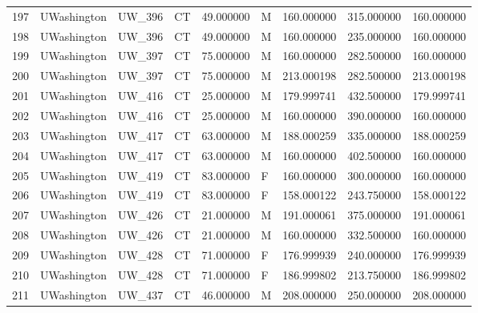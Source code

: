 \begin{tabular}{llllrlrrr}
197    &     UWashington &       UW\_396 &                 CT &  49.000000 &        M &       160.000000 &    315.000000 &  160.000000 \\
198    &     UWashington &       UW\_396 &                 CT &  49.000000 &        M &       160.000000 &    235.000000 &  160.000000 \\
199    &     UWashington &       UW\_397 &                 CT &  75.000000 &        M &       160.000000 &    282.500000 &  160.000000 \\
200    &     UWashington &       UW\_397 &                 CT &  75.000000 &        M &       213.000198 &    282.500000 &  213.000198 \\
201    &     UWashington &       UW\_416 &                 CT &  25.000000 &        M &       179.999741 &    432.500000 &  179.999741 \\
202    &     UWashington &       UW\_416 &                 CT &  25.000000 &        M &       160.000000 &    390.000000 &  160.000000 \\
203    &     UWashington &       UW\_417 &                 CT &  63.000000 &        M &       188.000259 &    335.000000 &  188.000259 \\
204    &     UWashington &       UW\_417 &                 CT &  63.000000 &        M &       160.000000 &    402.500000 &  160.000000 \\
205    &     UWashington &       UW\_419 &                 CT &  83.000000 &        F &       160.000000 &    300.000000 &  160.000000 \\
206    &     UWashington &       UW\_419 &                 CT &  83.000000 &        F &       158.000122 &    243.750000 &  158.000122 \\
207    &     UWashington &       UW\_426 &                 CT &  21.000000 &        M &       191.000061 &    375.000000 &  191.000061 \\
208    &     UWashington &       UW\_426 &                 CT &  21.000000 &        M &       160.000000 &    332.500000 &  160.000000 \\
209    &     UWashington &       UW\_428 &                 CT &  71.000000 &        F &       176.999939 &    240.000000 &  176.999939 \\
210    &     UWashington &       UW\_428 &                 CT &  71.000000 &        F &       186.999802 &    213.750000 &  186.999802 \\
211    &     UWashington &       UW\_437 &                 CT &  46.000000 &        M &       208.000000 &    250.000000 &  208.000000 \\

\end{tabular}
